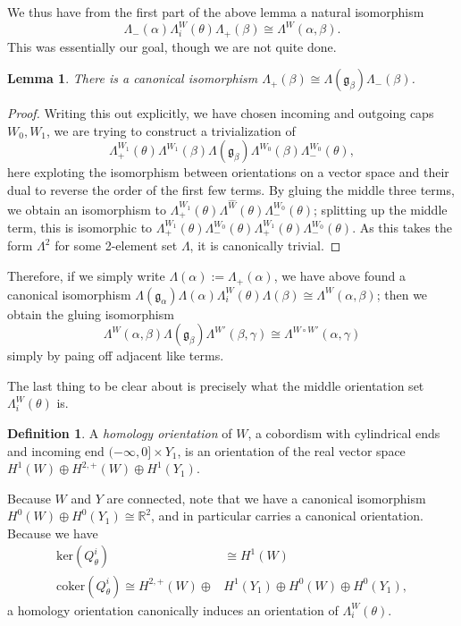 \documentclass{memo-l}
\newtheorem{lemma}[theorem]{Lemma}
\theoremstyle{definition}
\newtheorem{definition}[theorem]{Definition}
\theoremstyle{remark}
\numberwithin{section}{chapter}
\numberwithin{equation}{chapter}
\begin{document}
We thus have from the first part of the above lemma a natural isomorphism $$\Lambda_-(\alpha) \Lambda^W_i(\theta) \Lambda_+(\beta) \cong \Lambda^W(\alpha, \beta).$$ This was essentially our goal, though we are not quite done.

\begin{lemma}There is a canonical isomorphism $\Lambda_+(\beta) \cong \Lambda(\mathfrak g_\beta)\Lambda_-(\beta)$.
\end{lemma}
\begin{proof}Writing this out explicitly, we have chosen incoming and outgoing caps $W_0, W_1$, we are trying to construct a trivialization of $$\Lambda^{W_1}_+(\theta)\Lambda^{W_1}(\beta) \Lambda(\mathfrak g_\beta) \Lambda^{W_0}(\beta) \Lambda^{W_0}_-(\theta),$$ here exploting the isomorphism between orientations on a vector space and their dual to reverse the order of the first few terms. By gluing the middle three terms, we obtain an isomorphism to $\Lambda^{W_1}_+(\theta) \Lambda^{\hat W}(\theta) \Lambda^{W_0}_-(\theta)$; splitting up the middle term, this is isomorphic to $\Lambda^{W_1}_+(\theta) \Lambda^{W_0}_-(\theta) \Lambda^{W_1}_+(\theta) \Lambda^{W_0}_-(\theta)$. As this takes the form $\Lambda^2$ for some 2-element set $\Lambda$, it is canonically trivial.
\end{proof}

Therefore, if we simply write $\Lambda(\alpha) := \Lambda_+(\alpha)$, we have above found a canonical isomorphism $\Lambda(\mathfrak g_\alpha)\Lambda(\alpha) \Lambda^W_i(\theta) \Lambda(\beta) \cong \Lambda^W(\alpha, \beta)$; then we obtain the gluing isomorphism 
$$\Lambda^W(\alpha, \beta) \Lambda(\mathfrak g_\beta) \Lambda^{W'}(\beta, \gamma) \cong \Lambda^{W \circ W'}(\alpha, \gamma)$$ 
simply by paing off adjacent like terms.

The last thing to be clear about is precisely what the middle orientation set $\Lambda^W_i(\theta)$ is.

\begin{definition}\label{homology-or}A \emph{homology orientation} of $W$, a cobordism with cylindrical ends and incoming end $(-\infty, 0] \times Y_1$, is an orientation of the real vector space $H^1(W) \oplus H^{2,+}(W) \oplus H^1(Y_1)$.
\end{definition}
Because $W$ and $Y$ are connected, note that we have a canonical isomorphism $H^0(W) \oplus H^0(Y_1) \cong \mathbb R^2$, and in particular carries a canonical orientation. Because we have 
\begin{align*}\text{ker}(Q^i_\theta) &\cong H^1(W)\\
\text{coker}(Q^i_\theta) \cong H^{2,+}(W) \oplus &H^1(Y_1) \oplus H^0(W) \oplus H^0(Y_1),\end{align*}
a homology orientation canonically induces an orientation of $\Lambda^W_i(\theta)$.
\end{document}
